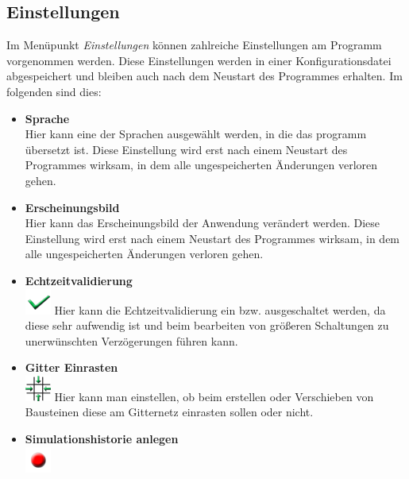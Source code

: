 \documentclass[12pt,a4paper]{scrartcl}
\begin{document}
\subsection{Einstellungen}
  Im Menüpunkt \textsl{Einstellungen} können zahlreiche Einstellungen am Programm vorgenommen werden. Diese Einstellungen werden in einer Konfigurationsdatei abgespeichert und bleiben auch nach dem Neustart des Programmes erhalten. Im folgenden sind dies:
  \begin{itemize}
   \item \textbf{Sprache} \\
      Hier kann eine der Sprachen ausgewählt werden, in die das programm übersetzt ist. Diese Einstellung wird erst nach einem Neustart des Programmes wirksam, in dem alle ungespeicherten Änderungen verloren gehen.
   \item \textbf{Erscheinungsbild} \\
      Hier kann das Erscheinungsbild der Anwendung verändert werden. Diese Einstellung wird erst nach einem Neustart des Programmes wirksam, in dem alle ungespeicherten Änderungen verloren gehen.
   \item \textbf{Echtzeitvalidierung} \\
	{\Large \hspace{0.5em} \includegraphics[height=2ex]{images/livecheck.png} \hspace{0.5em}}
      Hier kann die Echtzeitvalidierung ein bzw. ausgeschaltet werden, da diese sehr aufwendig ist und beim bearbeiten von größeren Schaltungen zu unerwünschten Verzögerungen führen kann.
   \item \textbf{Gitter Einrasten} \\
	{\Large \hspace{0.5em} \includegraphics[height=2ex]{images/gridlock.png} \hspace{0.5em}}
      Hier kann man einstellen, ob beim erstellen oder Verschieben von Bausteinen diese am Gitternetz einrasten sollen oder nicht.
   \item \textbf{Simulationshistorie anlegen} \\
	{\Large \hspace{0.5em} \includegraphics[height=2ex]{images/record.png} \hspace{0.5em}}

\end{itemize}
\end{document}
